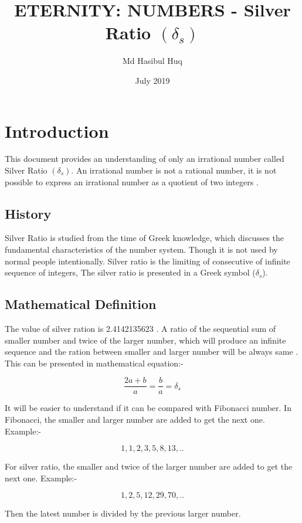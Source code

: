 \documentclass{article}
\title{ETERNITY: NUMBERS - Silver Ratio $(\delta_s)$}
\author{Md Hasibul Huq}
\date{July 2019}
\begin{document}
\maketitle

\section{Introduction}          %

This document provides an understanding of only an irrational  number called Silver Ratio $(\delta_s)$. An irrational  number is  not  a rational  number, it is not possible to express an irrational number as a quotient of two integers \cite{project_des}.
\subsection{History}
Silver Ratio is studied from the time of Greek knowledge, which discusses the fundamental characteristics of the number system. Though it is not used by normal people intentionally. Silver ratio is the limiting of consecutive  of infinite sequence of integers, The silver ratio is presented in a Greek symbol ($\delta_s$).

\subsection{Mathematical Definition}
The value of silver ration is 2.4142135623 \cite{jdc_silver}. A ratio of the sequential sum of smaller number and twice of the larger number, which will produce an infinite sequence and the ration between smaller and larger number will be always same \cite{numberphile_silver}. This can be presented in mathematical equation:- 

\[ \dfrac{2a + b}{a}  = \dfrac{b}{a} = \delta_s \]

It will be easier to understand if it can be compared with Fibonacci number.
In Fibonacci, the smaller and larger number are added to get the next one. 
Example:-

$$1,1,2,3,5,8,13,..$$

For silver ratio, the smaller and twice of the larger number are added to get the next one. Example:-

\[1,2,5,12,29,70,..\] 

Then the latest number is divided  by the previous larger number. 
\end{document}
